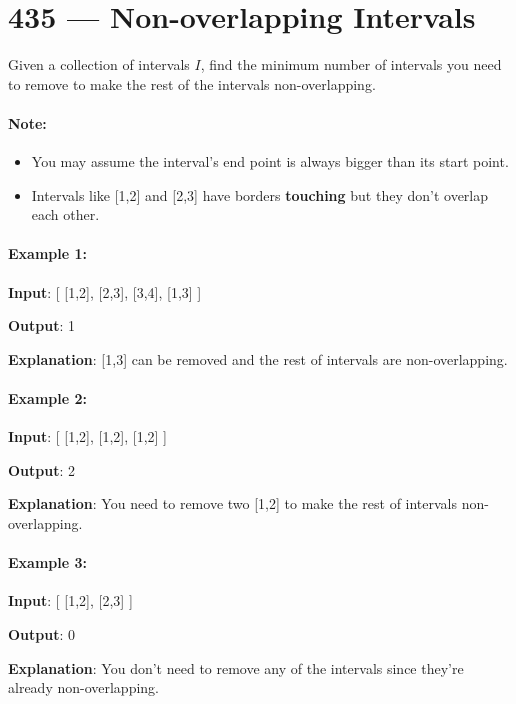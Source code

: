 \section{435 --- Non-overlapping Intervals}
Given a collection of intervals $I$, find the minimum number of intervals you need to remove to make the rest of the intervals non-overlapping.

\paragraph{Note:}

\begin{itemize}
\item You may assume the interval's end point is always bigger than its start point.
\item Intervals like [1,2] and [2,3] have borders \textbf{touching} but they don't overlap each other.
\end{itemize}
 

\paragraph{Example 1:}

\begin{flushleft}
\textbf{Input}: [ [1,2], [2,3], [3,4], [1,3] ]

\textbf{Output}: 1

\textbf{Explanation}: [1,3] can be removed and the rest of intervals are non-overlapping.
\end{flushleft}
 

\paragraph{Example 2:}

\begin{flushleft}
\textbf{Input}: [ [1,2], [1,2], [1,2] ]

\textbf{Output}: 2

\textbf{Explanation}: You need to remove two [1,2] to make the rest of intervals non-overlapping.
\end{flushleft}
 

\paragraph{Example 3:}

\begin{flushleft}
\textbf{Input}: [ [1,2], [2,3] ]

\textbf{Output}: 0

\textbf{Explanation}: You don't need to remove any of the intervals since they're already non-overlapping.
\end{flushleft}

